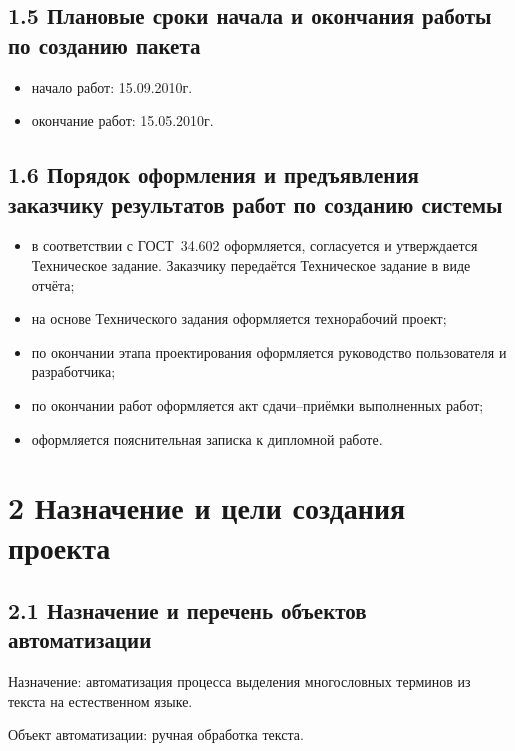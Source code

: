 \subsection*{1.5 Плановые сроки начала и окончания работы по созданию пакета}
\begin{itemize}
  \item начало работ: 15.09.2010г.
  \item окончание работ: 15.05.2010г.
\end{itemize}

\subsection*{1.6 Порядок оформления и предъявления заказчику результатов работ по созданию системы}
\begin{itemize}
  \item в соответствии с ГОСТ~34.602 оформляется, согласуется и
утверждается Техническое задание. Заказчику передаётся Техническое
задание в виде отчёта;
  \item на основе Технического задания оформляется технорабочий
проект;
  \item по окончании этапа проектирования оформляется руководство
пользователя и разработчика;
  \item по окончании работ оформляется акт сдачи--приёмки выполненных
работ;
  \item оформляется пояснительная записка к дипломной работе.
\end{itemize}

\section*{2 Назначение и цели создания проекта}
\subsection*{2.1 Назначение и перечень объектов автоматизации}
Назначение: автоматизация процесса выделения многословных
терминов из текста на естественном языке.

Объект автоматизации: ручная обработка текста.


